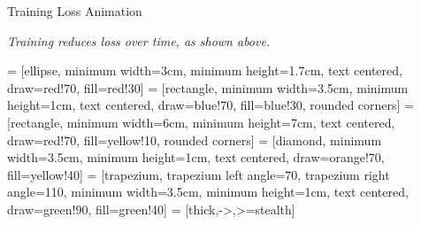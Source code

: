 \documentclass{beamer}
\begin{document}
\begin{frame}[t]{Training Loss Animation}
    \begin{center}
    \end{center}
    \vspace{0.5cm}
    \begin{center}
        \textit{Training reduces loss over time, as shown above.}
    \end{center}
\end{frame}




\usetikzlibrary{shapes.geometric, arrows}

 = [ellipse, minimum width=3cm, minimum height=1.7cm, text centered, draw=red!70, fill=red!30]
 = [rectangle, minimum width=3.5cm, minimum height=1cm, text centered, draw=blue!70, fill=blue!30, rounded corners]
 = [rectangle, minimum width=6cm, minimum height=7cm, text centered, draw=red!70, fill=yellow!10, rounded corners]
 = [diamond, minimum width=3.5cm, minimum height=1cm, text centered, draw=orange!70, fill=yellow!40]
 = [trapezium, trapezium left angle=70, trapezium right angle=110, minimum width=3.5cm, minimum height=1cm, text centered, draw=green!90, fill=green!40]
 = [thick,->,>=stealth]
\end{document}
